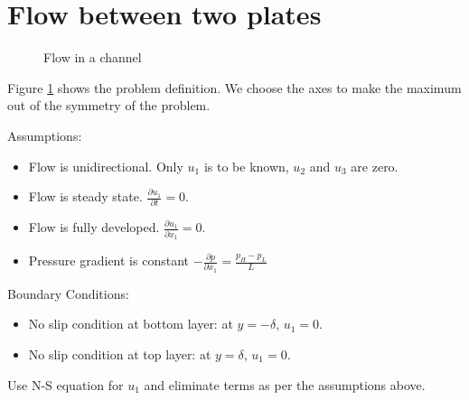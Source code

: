 \section{Flow between two plates}

\begin{figure}[h]
\begin{center}
\end{center}
\caption{Flow in a channel}
\label{pchannel}
\end{figure}

Figure \ref{pchannel} shows the problem definition. We choose the axes to make the maximum out of the symmetry of the problem.

Assumptions:
\begin{itemize}
\item Flow is unidirectional. Only $u_1$ is to be known, $u_2$ and $u_3$ are zero.
\item Flow is steady state. $\frac{\partial u_1}{\partial t} = 0$.
\item Flow is fully developed. $\frac{\partial u_1}{\partial x_1} = 0$.
\item Pressure gradient is constant $-\frac{\partial p}{\partial x_1} = \frac{p_H - p_L}{L}$
\end{itemize}

Boundary Conditions:
\begin{itemize}
\item No slip condition at bottom layer: at $y=-\delta$, $u_1=0$.
\item No slip condition at top layer: at $y=\delta$, $u_1=0$.
\end{itemize}

Use N-S equation for $u_1$ and eliminate terms as per the assumptions above.

